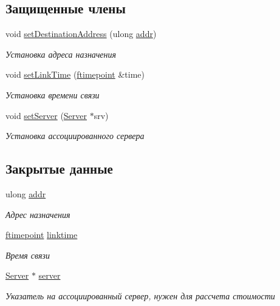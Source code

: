 \subsection*{Защищенные члены}
\begin{DoxyCompactItemize}
\item 
void \hyperlink{class_network_service_1_1_service_descriptor_ade61e982c82d03b92f5e096475720bd9}{set\+Destination\+Address} (ulong \hyperlink{class_network_service_1_1_service_descriptor_a0ee74116510749afe1c60a7634d3eae7}{addr})
\begin{DoxyCompactList}\small\item\em Установка адреса назначения \end{DoxyCompactList}\item 
void \hyperlink{class_network_service_1_1_service_descriptor_a7a539e5075ea95a40ec20ebc676093ea}{set\+Link\+Time} (\hyperlink{networkservice_8h_ac877dfabb0f4f6a8184aa821b447e81d}{ftimepoint} \&time)
\begin{DoxyCompactList}\small\item\em Установка времени связи \end{DoxyCompactList}\item 
void \hyperlink{class_network_service_1_1_service_descriptor_a16fa0f2b34adc7665ed32d139d580eb3}{set\+Server} (\hyperlink{class_network_service_1_1_server}{Server} $\ast$srv)
\begin{DoxyCompactList}\small\item\em Установка ассоциированного сервера \end{DoxyCompactList}\end{DoxyCompactItemize}
\subsection*{Закрытые данные}
\begin{DoxyCompactItemize}
\item 
ulong \hyperlink{class_network_service_1_1_service_descriptor_a0ee74116510749afe1c60a7634d3eae7}{addr}
\begin{DoxyCompactList}\small\item\em Адрес назначения \end{DoxyCompactList}\item 
\hyperlink{networkservice_8h_ac877dfabb0f4f6a8184aa821b447e81d}{ftimepoint} \hyperlink{class_network_service_1_1_service_descriptor_a08bfd17afce0cba1954d30bd76a14df4}{linktime}
\begin{DoxyCompactList}\small\item\em Время связи \end{DoxyCompactList}\item 
\hyperlink{class_network_service_1_1_server}{Server} $\ast$ \hyperlink{class_network_service_1_1_service_descriptor_ad504b32ced44a75e0e02ea961d9434c4}{server}
\begin{DoxyCompactList}\small\item\em Указатель на ассоциированный сервер, нужен для рассчета стоимости \end{DoxyCompactList}\end{DoxyCompactItemize}


